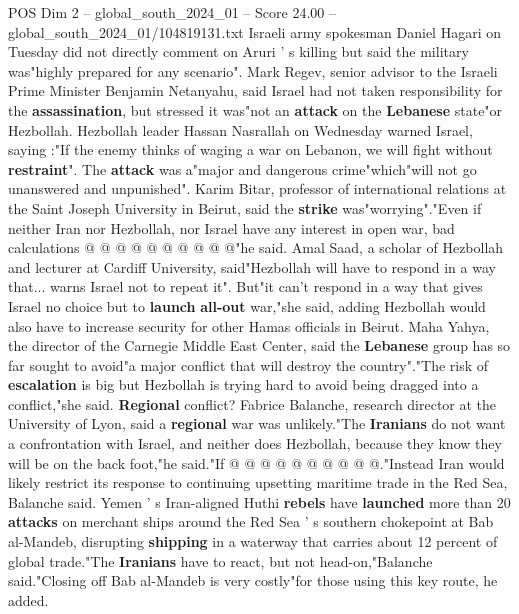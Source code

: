 \begin{textsample}{POS Dim 2 – global\_south\_2024\_01 – Score 24.00 – global\_south\_2024\_01/104819131.txt}
Israeli army spokesman Daniel Hagari on Tuesday did not directly comment on Aruri ' s killing but said the military was"highly prepared for any scenario".
Mark Regev, senior advisor to the Israeli Prime Minister Benjamin Netanyahu, said Israel had not taken responsibility for the \textbf{assassination}, but stressed it was"not an \textbf{attack} on the \textbf{Lebanese} state"or Hezbollah.
Hezbollah leader Hassan Nasrallah on Wednesday warned Israel, saying :"If the enemy thinks of waging a war on Lebanon, we will fight without \textbf{restraint}".
The \textbf{attack} was a"major and dangerous crime"which"will not go unanswered and unpunished".
Karim Bitar, professor of international relations at the Saint Joseph University in Beirut, said the \textbf{strike} was"worrying"."Even if neither Iran nor Hezbollah, nor Israel have any interest in open war, bad calculations @ @ @ @ @ @ @ @ @ @"he said.
Amal Saad, a scholar of Hezbollah and lecturer at Cardiff University, said"Hezbollah will have to respond in a way that... warns Israel not to repeat it".
But"it can't respond in a way that gives Israel no choice but to \textbf{launch} \textbf{all-out} war,"she said, adding Hezbollah would also have to increase security for other Hamas officials in Beirut.
Maha Yahya, the director of the Carnegie Middle East Center, said the \textbf{Lebanese} group has so far sought to avoid"a major conflict that will destroy the country"."The risk of \textbf{escalation} is big but Hezbollah is trying hard to avoid being dragged into a conflict,"she said. \textbf{Regional} conflict?
Fabrice Balanche, research director at the University of Lyon, said a \textbf{regional} war was unlikely."The \textbf{Iranians} do not want a confrontation with Israel, and neither does Hezbollah, because they know they will be on the back foot,"he said."If @ @ @ @ @ @ @ @ @ @."Instead Iran would likely restrict its response to continuing upsetting maritime trade in the Red Sea, Balanche said.
Yemen ' s Iran-aligned Huthi \textbf{rebels} have \textbf{launched} more than 20 \textbf{attacks} on merchant ships around the Red Sea ' s southern chokepoint at Bab al-Mandeb, disrupting \textbf{shipping} in a waterway that carries about 12 percent of global trade."The \textbf{Iranians} have to react, but not head-on,"Balanche said."Closing off Bab al-Mandeb is very costly"for those using this key route, he added.

\end{textsample}
